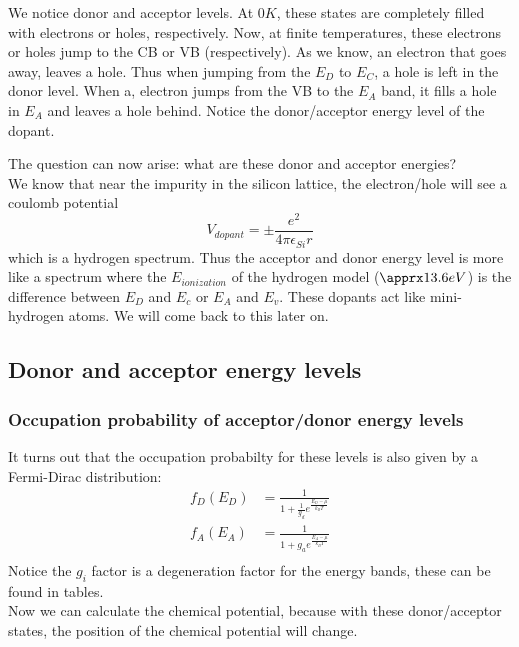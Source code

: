 We notice donor and acceptor levels. At $0K$, these states are completely filled with electrons or holes, respectively. Now, at finite temperatures, these electrons or holes jump to the CB or VB (respectively). As we know, an electron that goes away, leaves a hole. Thus when jumping from the $E_D$ to $E_C$, a hole is left in the donor level. When a, electron jumps from the VB to the $E_A$ band, it fills a hole in $E_A$ and leaves a hole behind. Notice the donor/acceptor energy level of the dopant.\\ \par
The question can now arise: what are these donor and acceptor energies? \\
We know that near the impurity in the silicon lattice, the electron/hole will see a coulomb potential
\begin{equation}
	V_{dopant} = \pm \frac{e^2}{4\pi\epsilon_{Si}r}
\end{equation}
which is a hydrogen spectrum. Thus the acceptor and donor energy level is more like a spectrum where the $E_{ionization}$ of the hydrogen model ($\apprx 13.6 eV$) is the difference between $E_D$ and $E_c$ or $E_A$ and $E_v$. These dopants act like mini-hydrogen atoms. We will come back to this later on.

\subsection{Donor and acceptor energy levels}
\subsubsection{Occupation probability of acceptor/donor energy levels}
It turns out that the occupation probabilty for these levels is also given by a Fermi-Dirac distribution:
\begin{align}
	f_D(E_D) &= \frac{1}{1+\frac{1}{g_d}e^{\frac{E_D-\mu}{k_BT}}} \\
	f_A(E_A) &= \frac{1}{1+g_ae^{\frac{E_A-\mu}{k_BT}}} \\
\end{align}
Notice the $g_i$ factor is a degeneration factor for the energy bands, these can be found in tables.\\
Now we can calculate the chemical potential, because with these donor/acceptor states, the position of the chemical potential will change.

